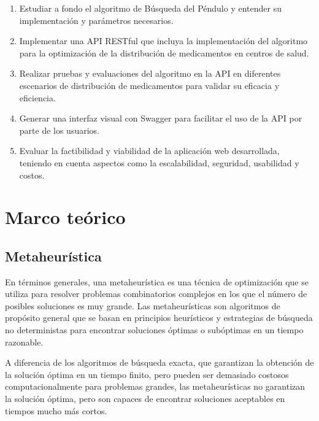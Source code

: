 \documentclass[conference]{IEEEtran}
\begin{document}
\begin{enumerate}
    \item Estudiar a fondo el algoritmo de Búsqueda del Péndulo y entender su
          implementación y parámetros necesarios.
    \item Implementar una API RESTful que incluya la implementación del
          algoritmo para la optimización de la distribución de medicamentos en
          centros de
          salud.
    \item Realizar pruebas y evaluaciones del algoritmo en la API en diferentes
          escenarios de distribución de medicamentos para validar su eficacia y
          eficiencia.
    \item Generar una interfaz visual con Swagger para facilitar el uso de la
          API por parte de los usuarios.
    \item Evaluar la factibilidad y viabilidad de la aplicación web
          desarrollada, teniendo en cuenta aspectos como la escalabilidad,
          seguridad,
          usabilidad y costos.
\end{enumerate}

\section{Marco teórico}
\label{sec:MT}

\subsection{Metaheurística}
En términos generales, una metaheurística es una técnica de optimización que se
utiliza para resolver problemas combinatorios complejos en los que el número de
posibles soluciones es muy grande. Las metaheurísticas son algoritmos de
propósito general que se basan en principios heurísticos y estrategias de
búsqueda no deterministas para encontrar soluciones óptimas o subóptimas en un
tiempo razonable.

A diferencia de los algoritmos de búsqueda exacta, que garantizan la obtención
de la solución óptima en un tiempo finito, pero pueden ser demasiado costosos
computacionalmente para problemas grandes, las metaheurísticas no garantizan la
solución óptima, pero son capaces de encontrar soluciones aceptables en tiempos
mucho más cortos.
\end{document}
